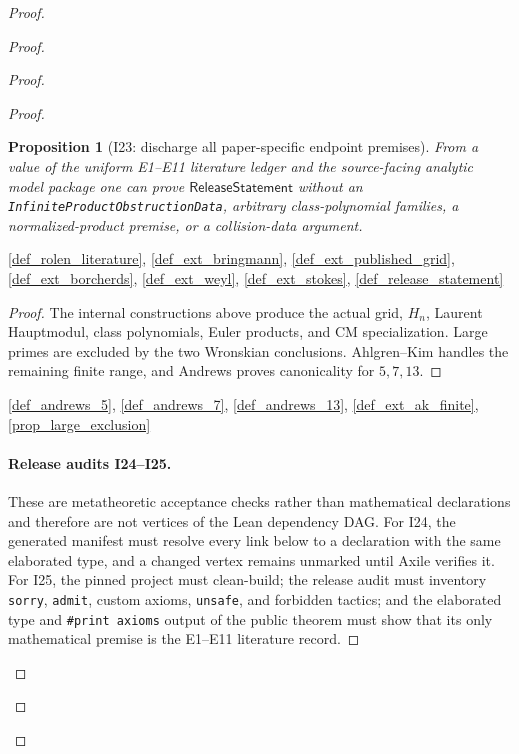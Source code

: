\documentclass[11pt,a4paper]{article}
\numberwithin{equation}{section}
\theoremstyle{plain}\newtheorem{theorem}{Theorem}[section]\newaliascnt{proposition}{theorem}\newtheorem{proposition}[proposition]{Proposition}\aliascntresetthe{proposition}\newaliascnt{lemma}{theorem}\newtheorem{lemma}[lemma]{Lemma}\aliascntresetthe{lemma}
\theoremstyle{definition}\newaliascnt{definition}{theorem}\newtheorem{definition}[definition]{Definition}\aliascntresetthe{definition}\newaliascnt{notation}{theorem}\newtheorem{notation}[notation]{Notation}\aliascntresetthe{notation}
\providecommand{\lean}[1]{}\providecommand{\leanok}{}
\begin{document}
\begin{proof}
\begin{proof}
\begin{proof}
\begin{proof}
\begin{proposition}[I23: discharge all paper-specific endpoint premises]\label{prop_i23_public_endpoint}\lean{SptCM.Repair.canonicalCongruencePrime_iff_of_uniform_literature}\leanok
From a value of the uniform E1--E11 literature ledger and the source-facing
analytic model package one can prove $\mathsf{ReleaseStatement}$ without an
\texttt{InfiniteProductObstructionData}, arbitrary class-polynomial families,
a normalized-product premise, or a collision-data argument.
\end{proposition}
\begin{uses-statement}\ref{def_rolen_literature}, \ref{def_ext_bringmann},
\ref{def_ext_published_grid}, \ref{def_ext_borcherds}, \ref{def_ext_weyl},
\ref{def_ext_stokes}, \ref{def_release_statement}\end{uses-statement}
\begin{proof}
The internal constructions above produce the actual grid, $H_n$, Laurent Hauptmodul, class polynomials, Euler products, and CM specialization.  Large primes are excluded by the two Wronskian conclusions.  Ahlgren--Kim handles the remaining finite range, and Andrews proves canonicality for $5,7,13$.
\end{proof}
\begin{uses-proof}\ref{def_andrews_5}, \ref{def_andrews_7}, \ref{def_andrews_13}, \ref{def_ext_ak_finite}, \ref{prop_large_exclusion}\end{uses-proof}

\paragraph{Release audits I24--I25.}
These are metatheoretic acceptance checks rather than mathematical
declarations and therefore are not vertices of the Lean dependency DAG.
For I24, the generated manifest must resolve every link below to a declaration
with the same elaborated type, and a changed vertex remains unmarked until
Axile verifies it.  For I25, the pinned project must clean-build; the release
audit must inventory \texttt{sorry}, \texttt{admit}, custom axioms,
\texttt{unsafe}, and forbidden tactics; and the elaborated type and
\texttt{\#print axioms} output of the public theorem must show that its only
mathematical premise is the E1--E11 literature record.


\end{proof}
\end{proof}
\end{proof}
\end{proof}
\end{document}
